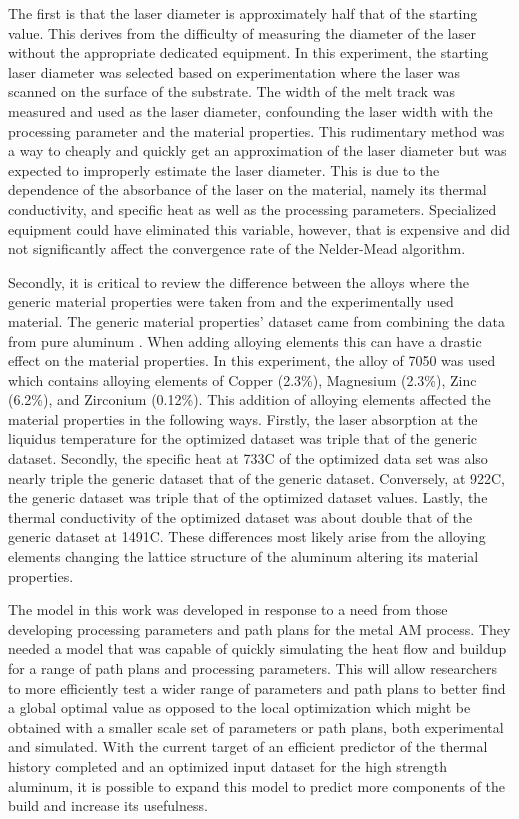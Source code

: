 The first is that the laser diameter is approximately half that of the starting value.  This derives from the difficulty of measuring the diameter of the laser without the appropriate dedicated equipment.  In this experiment, the starting laser diameter was selected based on experimentation where the laser was scanned on the surface of the substrate.  The width of the melt track was measured and used as the laser diameter, confounding the laser width with the processing parameter and the material properties.  This rudimentary method was a way to cheaply and quickly get an approximation of the laser diameter but was expected to improperly estimate the laser diameter.  This is due to the dependence of the absorbance of the laser on the material, namely its thermal conductivity, and specific heat as well as the processing parameters.  Specialized equipment could have eliminated this variable, however, that is expensive and did not significantly affect the convergence rate of the Nelder-Mead algorithm.  

Secondly, it is critical to review the difference between the alloys where the generic material properties were taken from and the experimentally used material.  The generic material properties' dataset came from combining the data from pure aluminum \cite{leitner_thermophysical_2017, boyden_temperature_2006}.  When adding alloying elements this can have a drastic effect on the material properties.  In this experiment, the alloy of 7050 was used which contains alloying elements of  Copper (2.3\%), Magnesium (2.3\%), Zinc (6.2\%), and Zirconium (0.12\%).  This addition of alloying elements affected the material properties in the following ways.  Firstly, the laser absorption at the liquidus temperature for the optimized dataset was triple that of the generic dataset.  Secondly, the specific heat at 733\degree C of the optimized data set was also nearly triple the generic dataset that of the generic dataset.  Conversely, at 922\degree C, the generic dataset was triple that of the optimized dataset values.  Lastly, the thermal conductivity of the optimized dataset was about double that of the generic dataset at 1491\degree C.  These differences most likely arise from the alloying elements changing the lattice structure of the aluminum altering its material properties.

The model in this work was developed in response to a need from those developing processing parameters and path plans for the metal \ac{AM} process.  They needed a model that was capable of quickly simulating the heat flow and buildup for a range of path plans and processing parameters.
This will allow researchers to more efficiently test a wider range of parameters and path plans to better find a global optimal value as opposed to the local optimization which might be obtained with a smaller scale set of parameters or path plans, both experimental and simulated.
With the current target of an efficient predictor of the thermal history completed and an optimized input dataset for the high strength aluminum, it is possible to expand this model to predict more components of the build and increase its usefulness.

